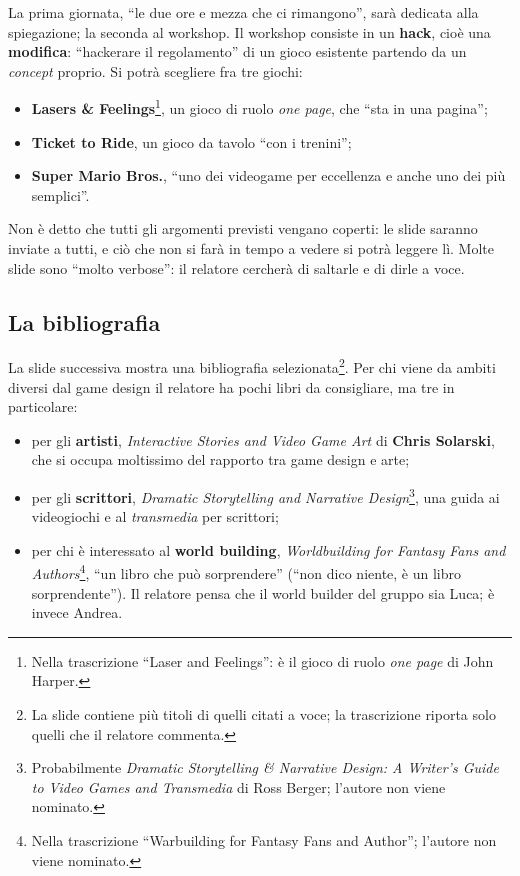La prima giornata, ``le due ore e mezza che ci rimangono'', sarà dedicata alla
spiegazione; la seconda al workshop. Il workshop consiste in un \textbf{hack},
cioè una \textbf{modifica}: ``hackerare il regolamento'' di un gioco esistente
partendo da un \emph{concept} proprio. Si potrà scegliere fra tre giochi:
\begin{itemize}
  \item \textbf{Lasers \& Feelings}\footnote{Nella trascrizione ``Laser and
        Feelings'': è il gioco di ruolo \emph{one page} di John Harper.}, un
        gioco di ruolo \emph{one page}, che ``sta in una pagina'';
  \item \textbf{Ticket to Ride}, un gioco da tavolo ``con i trenini'';
  \item \textbf{Super Mario Bros.}, ``uno dei videogame per eccellenza e anche
        uno dei più semplici''.
\end{itemize}
Non è detto che tutti gli argomenti previsti vengano coperti: le slide saranno
inviate a tutti, e ciò che non si farà in tempo a vedere si potrà leggere lì.
Molte slide sono ``molto verbose'': il relatore cercherà di saltarle e di
dirle a voce.

\subsection{La bibliografia}
\label{subsec:z6-bibliografia}

La slide successiva mostra una bibliografia selezionata\footnote{La slide
contiene più titoli di quelli citati a voce; la trascrizione riporta solo
quelli che il relatore commenta.}. Per chi viene da ambiti diversi dal game
design il relatore ha pochi libri da consigliare, ma tre in particolare:
\begin{itemize}
  \item per gli \textbf{artisti}, \emph{Interactive Stories and Video Game Art}
        di \textbf{Chris Solarski}, che si occupa moltissimo del rapporto tra
        game design e arte;
  \item per gli \textbf{scrittori}, \emph{Dramatic Storytelling and Narrative
        Design}\footnote{Probabilmente \emph{Dramatic Storytelling \& Narrative
        Design: A Writer's Guide to Video Games and Transmedia} di Ross Berger;
        l'autore non viene nominato.}, una guida ai videogiochi e al
        \emph{transmedia} per scrittori;
  \item per chi è interessato al \textbf{world building}, \emph{Worldbuilding
        for Fantasy Fans and Authors}\footnote{Nella trascrizione ``Warbuilding
        for Fantasy Fans and Author''; l'autore non viene nominato.}, ``un libro
        che può sorprendere'' (``non dico niente, è un libro sorprendente''). Il
        relatore pensa che il world builder del gruppo sia Luca; è invece
        Andrea.
\end{itemize}


